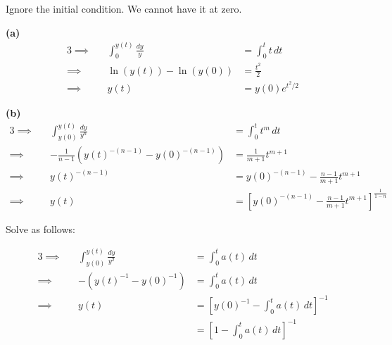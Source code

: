 \documentclass[a4paper]{article}
\begin{document}

Ignore the initial condition. We cannot have it at zero.

\textbf{(a)}
\begin{alignat*}{3}
	\implies &&\int^{y \!\left( t \right) }_{0} \frac{dy}{y} & = \int^{t}_{0} t \, dt  \\
	\implies && \ln\left( y \!\left( t \right)  \right) - \ln\left( y \!\left( 0 \right)  \right) & = \frac{t^{2}}{2} \\
	\implies && y \!\left( t \right) & = y \!\left( 0 \right) e^{t^{2}/2}
\end{alignat*}

\textbf{(b)} 
\begin{alignat*}{3}
	\implies &&\int^{y \!\left( t \right) }_{y \!\left( 0 \right) } \frac{dy}{y^{n}} & = \int^{t}_{0} t^{m} \, dt  \\
	\implies && -\frac{1}{n-1} \!\left(  y \!\left( t \right)^{-\!\left( n - 1 \right) } - y \!\left( 0 \right)^{-\!\left( n - 1 \right) }\right) & = \frac{1}{m + 1}t^{m + 1} \\ 
	\implies && y \!\left( t \right)^{-\!\left( n - 1 \right) } & = y \!\left( 0 \right)^{-\!\left( n - 1 \right) } - \frac{n - 1}{m + 1}t^{m + 1} \\
	\implies && y \!\left( t \right) & = \left[ y \!\left( 0 \right)^{-\!\left( n - 1 \right) } - \frac{n - 1}{m + 1}t^{m + 1} \right]^{\frac{1}{1 - n}} 
\end{alignat*}


Solve as follows:

\begin{alignat*}{3}
	\implies && \int^{y \!\left( t \right) }_{y \!\left( 0 \right) } \frac{dy}{y^{2}} & = \int^{t}_{0} a \!\left( t \right)  \, dt  \\
	\implies && -\!\left( y \!\left( t \right)^{-1} - y \!\left( 0 \right)^{-1} \right) & = \int^{t}_{0} a \!\left( t \right)  \, dt  \\ 
	\implies && y \!\left( t \right)  & = \left[ y \!\left( 0 \right)^{-1} - \int^{t}_{0} a \!\left( t \right)  \, dt  \right]^{-1} \\
		 && & = \left[ 1 - \int^{t}_{0} a \!\left( t \right)  \, dt  \right]^{-1}
\end{alignat*}
\end{document}
